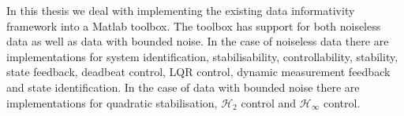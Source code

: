 In this thesis we deal with implementing the existing data informativity framework into a Matlab toolbox. The toolbox has support for both noiseless data as well as data with bounded noise. In the case of noiseless data there are implementations for system identification, stabilisability, controllability, stability, state feedback, deadbeat control, LQR control, dynamic measurement feedback and state identification. In the case of data with bounded noise there are implementations for quadratic stabilisation, $\mathcal{H}_2$ control and $\mathcal{H}_\infty$ control.